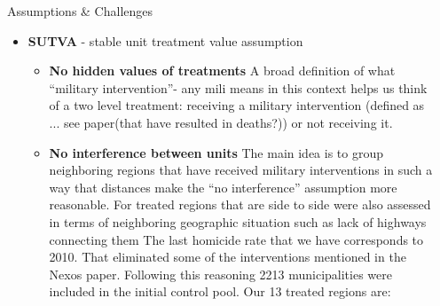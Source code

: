 \documentclass[final]{beamer}
\newlength{\sepwid}
\newlength{\onecolwid}
\newlength{\threecolwid}
\begin{document}
\begin{frame}[t]
\begin{columns}[t]
\begin{column}{\onecolwid}
      \vskip2ex

    \end{column}

    \begin{column}{\sepwid}\end{column}			%
    \begin{column}{\threecolwid}					  %
      \begin{block}{Assumptions \& Challenges}
        \begin{itemize}
        \item \textbf{SUTVA} - stable unit treatment value assumption
          \begin{itemize}
          \item \textbf{No hidden values of treatments} A broad definition of what ``military intervention''- any mili means in this context helps us think of a two level treatment: receiving a military intervention (defined as ... see paper(that have resulted in deaths?)) or not receiving it.
          \item \textbf{No interference between units} The main idea is to group neighboring regions that have received military interventions in such a way that distances make the ``no interference'' assumption  more reasonable. For treated regions that are side to side were also assessed in terms of neighboring  geographic situation such as lack of highways connecting them %
            The last homicide rate that we have corresponds to 2010. That eliminated some of the interventions mentioned in the Nexos paper. 
            Following this reasoning 2213 municipalities were included in the initial control pool. Our 13 treated regions are:
		


\end{itemize}
\end{itemize}
\end{block}
\end{column}
\end{columns}
\end{frame}
\end{document}

